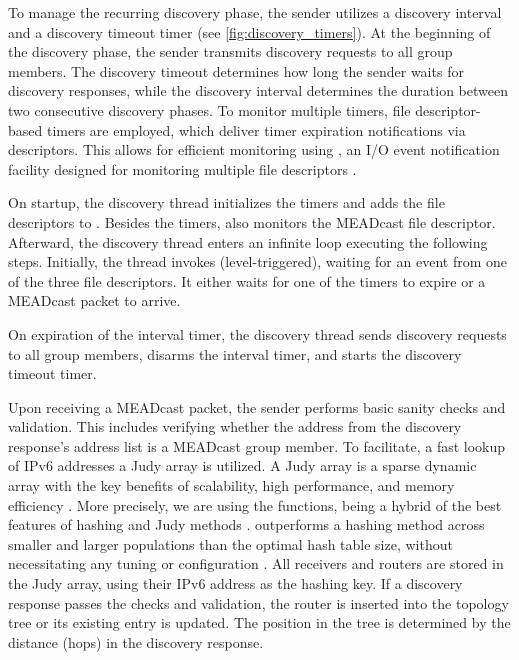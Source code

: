 To manage the recurring discovery phase, the sender utilizes a discovery
    interval and a discovery timeout timer (see
    \autoref{fig:discovery_timers}).
At the beginning of the discovery phase, the sender transmits discovery
    requests to all group members.
The discovery timeout determines how long the sender waits for discovery
    responses, while the discovery interval determines the duration between two
    consecutive discovery phases.
To monitor multiple timers, file descriptor-based timers are employed, which
    deliver timer expiration notifications via descriptors.
This allows for efficient monitoring using 
    \cite{man_timerfd}, an I/O event notification facility designed for
    monitoring multiple file descriptors \cite{man_epoll}.

On startup, the discovery thread initializes the timers and adds the file
    descriptors to .
Besides the timers,  also monitors the MEADcast file
    descriptor.
Afterward, the discovery thread enters an infinite loop executing the following
    steps.
Initially, the thread invokes  (level-triggered), waiting
    for an event from one of the three file descriptors.
It either waits for one of the timers to expire or a MEADcast packet to arrive.

On expiration of the interval timer, the discovery thread sends discovery
    requests to all group members, disarms the interval timer, and starts the
    discovery timeout timer.

Upon receiving a MEADcast packet, the sender performs basic sanity checks and
    validation.
This includes verifying whether the address from the discovery response's
    address list is a MEADcast group member.
To facilitate, a fast lookup of IPv6 addresses a Judy array is utilized.
A Judy array is a sparse dynamic array with the key benefits of scalability,
    high performance, and memory efficiency \cite{web_judy}.
More precisely, we are using the  functions, being a
    hybrid of the best features of hashing  and  Judy  methods \cite{man_judy}.
 outperforms a hashing method across smaller and larger
    populations than the optimal hash table size, without necessitating any
    tuning or configuration \cite{man_judy}.
All receivers and routers are stored in the Judy array, using their IPv6
    address as the hashing key.
If a discovery response passes the checks and validation, the router
    is inserted into the topology tree or its existing entry is updated.
The position in the tree is determined by the distance (hops) in the discovery 
    response.

